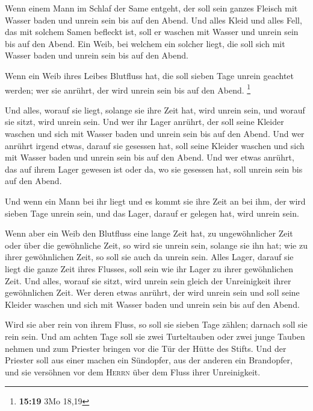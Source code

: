  Wenn einem Mann im Schlaf der Same entgeht, der soll
sein ganzes Fleisch mit Wasser baden und unrein sein bis auf den Abend.
 Und alles Kleid und alles Fell, das mit solchem Samen
befleckt ist, soll er waschen mit Wasser und unrein sein bis auf den
Abend.  Ein Weib, bei welchem ein solcher liegt, die soll
sich mit Wasser baden und unrein sein bis auf den Abend.

 Wenn ein Weib ihres Leibes Blutfluss hat, die soll
sieben Tage unrein geachtet werden; wer sie anrührt, der wird unrein
sein bis auf den Abend. \footnote{\textbf{15:19} 3Mo 18,19}

 Und alles, worauf sie liegt, solange sie ihre Zeit hat,
wird unrein sein, und worauf sie sitzt, wird unrein sein.
 Und wer ihr Lager anrührt, der soll seine Kleider
waschen und sich mit Wasser baden und unrein sein bis auf den Abend.
 Und wer anrührt irgend etwas, darauf sie gesessen hat,
soll seine Kleider waschen und sich mit Wasser baden und unrein sein bis
auf den Abend.  Und wer etwas anrührt, das auf ihrem
Lager gewesen ist oder da, wo sie gesessen hat, soll unrein sein bis auf
den Abend.

 Und wenn ein Mann bei ihr liegt und es kommt sie ihre
Zeit an bei ihm, der wird sieben Tage unrein sein, und das Lager, darauf
er gelegen hat, wird unrein sein.

 Wenn aber ein Weib den Blutfluss eine lange Zeit hat, zu
ungewöhnlicher Zeit oder über die gewöhnliche Zeit, so wird sie unrein
sein, solange sie ihn hat; wie zu ihrer gewöhnlichen Zeit, so soll sie
auch da unrein sein.  Alles Lager, darauf sie liegt die
ganze Zeit ihres Flusses, soll sein wie ihr Lager zu ihrer gewöhnlichen
Zeit. Und alles, worauf sie sitzt, wird unrein sein gleich der
Unreinigkeit ihrer gewöhnlichen Zeit.  Wer deren etwas
anrührt, der wird unrein sein und soll seine Kleider waschen und sich
mit Wasser baden und unrein sein bis auf den Abend.

 Wird sie aber rein von ihrem Fluss, so soll sie sieben
Tage zählen; darnach soll sie rein sein.  Und am achten
Tage soll sie zwei Turteltauben oder zwei junge Tauben nehmen und zum
Priester bringen vor die Tür der Hütte des Stifts.  Und
der Priester soll aus einer machen ein Sündopfer, aus der anderen ein
Brandopfer, und sie versöhnen vor dem \textsc{Herrn} über dem Fluss
ihrer Unreinigkeit.


